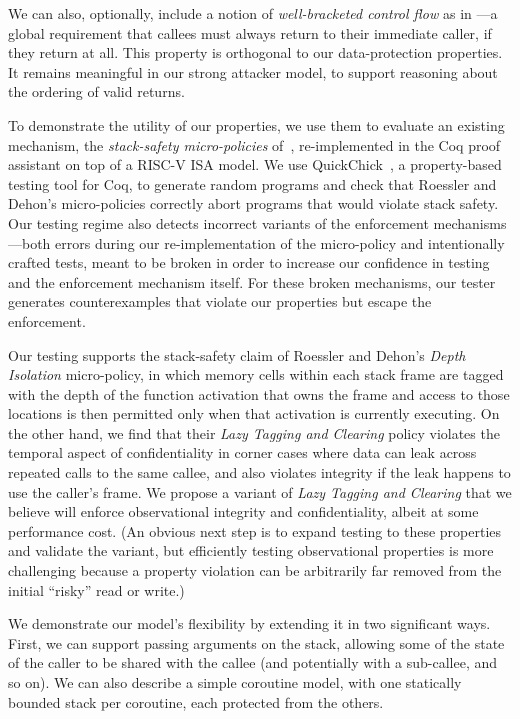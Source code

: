 \documentclass[acmtog,review,anonymous]{acmart}\settopmatter{printfolios=true,printccs=false,printacmref=false}
\begin{document}
We can also, optionally, include a notion of {\em well-bracketed control flow}
as in \citet{SkorstengaardSTK}---a global requirement that callees
must always return
to their immediate caller, if they return at all. This property is orthogonal to our
data-protection properties. It remains meaningful in our strong attacker model,
to support reasoning about the ordering of valid returns.

To demonstrate the utility of our properties, we use them
to evaluate an existing mechanism, the
{\em stack-safety micro-policies} of~\citet{DBLP:conf/sp/RoesslerD18}, re-implemented
in the Coq proof assistant on top of a RISC-V ISA model. We
use QuickChick~\citep{Denes:VSL2014,Pierce:SF4}, a property-based testing
tool for Coq, to generate random programs and check
that Roessler and Dehon's micro-policies correctly abort programs that
would violate stack safety.
Our testing regime also detects incorrect variants of the
enforcement mechanisms---both errors
during our re-implementation of the micro-policy and
intentionally crafted tests, meant to be broken in order to increase our confidence
in testing and the enforcement mechanism itself. For these broken
mechanisms, our tester
generates counterexamples that violate our properties but escape the
enforcement.

Our testing supports the stack-safety claim of Roessler and Dehon's {\em Depth
  Isolation} micro-policy, in
which memory cells within each stack frame are tagged with the depth of
the function activation that owns the frame and access to those locations is
then permitted only when that activation is currently executing.
On the other hand, we find that their \emph{Lazy Tagging and Clearing} policy
violates the temporal aspect of confidentiality in
corner cases where data can leak across repeated calls to the same callee,
and also violates integrity if the leak happens to use the caller's frame. We
propose a variant of {\em Lazy Tagging and Clearing} that
  we believe will enforce observational
integrity and confidentiality, albeit at some performance cost. (An obvious next step
is to expand testing to these properties and validate the variant, but
efficiently
testing observational properties is more challenging because a property
violation can be arbitrarily far removed from the initial ``risky'' read or
write.)

We demonstrate our model's flexibility by extending it in two significant ways.
First, we can support passing arguments on the stack, allowing some of the state of
the caller to be shared with the callee (and potentially with a sub-callee,
and so on).  We can also describe a simple coroutine model, with one
statically bounded stack per coroutine, each protected from the others.
\end{document}

